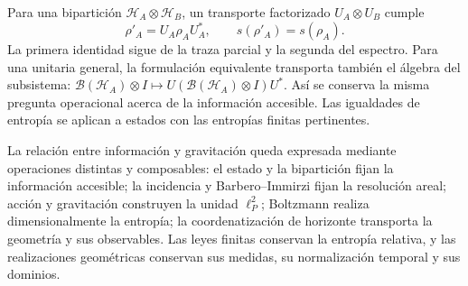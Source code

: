 Para una bipartición \(\mathcal H_A\otimes\mathcal H_B\), un
transporte factorizado \(U_A\otimes U_B\) cumple
\[
 \rho'_A=U_A\rho_AU_A^*,\qquad s(\rho'_A)=s(\rho_A).
\]
La primera identidad sigue de la traza parcial y la segunda del espectro.
Para una unitaria general, la formulación equivalente transporta también
el álgebra del subsistema:
\(\mathcal B(\mathcal H_A)\otimes I\mapsto
U(\mathcal B(\mathcal H_A)\otimes I)U^*\).
Así se conserva la misma pregunta operacional acerca de la información
accesible. Las igualdades de entropía se aplican a estados con las entropías
finitas pertinentes.

La relación entre información y gravitación queda expresada mediante
operaciones distintas y composables: el estado y la bipartición fijan la
información accesible; la incidencia y Barbero--Immirzi fijan la resolución
areal; acción y gravitación construyen la unidad \(\ell_P^2\);
Boltzmann realiza dimensionalmente la entropía; la coordenatización de horizonte
transporta la geometría y sus observables. Las leyes finitas conservan la
entropía relativa, y las realizaciones geométricas conservan sus medidas,
su normalización temporal y sus dominios.
